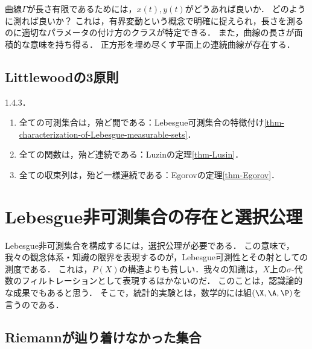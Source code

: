 \documentclass[uplatex, dvipdfmx]{jsreport}
\begin{document}
\begin{question}[曲線の長さとフラクタル]
    曲線$\Gamma$が長さ有限であるためには，$x(t),y(t)$がどうあれば良いか．
    どのように測れば良いか？
    これは，有界変動という概念で明確に捉えられ，長さを測るのに適切なパラメータの付け方のクラスが特定できる．
    また，曲線の長さが面積的な意味を持ち得る．
    正方形を埋め尽くす平面上の連続曲線が存在する．
\end{question}

\subsection{Littlewoodの3原則}

\cite{Stein-Shakarchi-05-RealAnalysis} 1.4.3．
\begin{enumerate}
    \item 全ての可測集合は，殆ど開である：Lebesgue可測集合の特徴付け\ref{thm-characterization-of-Lebesgue-measurable-sets}．
    \item 全ての関数は，殆ど連続である：Luzinの定理\ref{thm-Lusin}．
    \item 全ての収束列は，殆ど一様連続である：Egorovの定理\ref{thm-Egorov}．
\end{enumerate}

\section{Lebesgue非可測集合の存在と選択公理}

\begin{tcolorbox}[colframe=ForestGreen, colback=ForestGreen!10!white,breakable,colbacktitle=ForestGreen!40!white,coltitle=black,fonttitle=\bfseries\sffamily,
title=]
    Lebesgue非可測集合を構成するには，選択公理が必要である．
    この意味で，我々の観念体系・知識の限界を表現するのが，Lebesgue可測性とその射としての測度である．
    これは，$P(X)$の構造よりも貧しい．我々の知識は，$X$上の$\sigma$-代数のフィルトレーションとして表現するほかないのだ．
    このことは，認識論的な成果でもあると思う．
    そこで，統計的実験とは，数学的には組$(\X,\A,\P)$を言うのである．
\end{tcolorbox}

\subsection{Riemannが辿り着けなかった集合}
\end{document}
